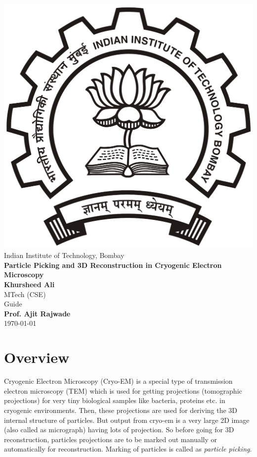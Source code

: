 \documentclass{report}
\begin{document}
\begin{titlepage}
\begin{center}

\includegraphics[scale=0.08]{iitb-logo.png}\\
\large{Indian Institute of Technology, Bombay}\\
\vspace*{3cm}
\textbf{\huge{Particle Picking and 3D Reconstruction in Cryogenic Electron Microscopy}}\\
\vspace*{3cm}
\Large{\textbf{Khursheed Ali}}\\
\large{MTech (CSE)}\\
\vspace*{3cm}
\large{Guide}\\
\Large{\textbf{Prof. Ajit Rajwade}}\\
\vfill
\today
\end{center}
\end{titlepage}

\tableofcontents
\newpage

\chapter{Overview}

Cryogenic Electron Microscopy (Cryo-EM) is a special type of transmission electron microscopy (TEM) which is used for getting projections (tomographic projections) for very tiny biological samples like bacteria, proteins etc. in cryogenic environments. Then, these projections are used for deriving the 3D internal structure of particles. But output from cryo-em is a very large 2D image (also called as micrograph) having lots of projection. So before going for 3D reconstruction, particles projections are to be  marked out manually or automatically for reconstruction. Marking of particles is called as \textit{particle picking}.\\
\end{document}
